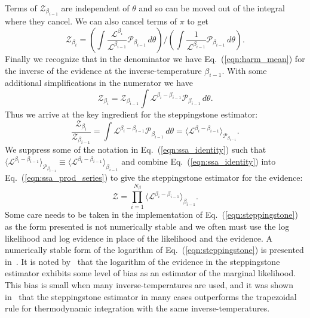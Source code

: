 Terms of $\mathcal{Z}_{\beta_{i-1}}$ are independent of $\theta$ and so can be moved out of the integral where they cancel. We can also cancel terms of $\pi$ to get
\begin{equation}
    \mathcal{Z}_{\beta_i} = \left(\int \frac{ \mathcal{L}^{\beta_i} }{\mathcal{L}^{\beta_{i-1}}} \mathcal{P}_{\beta_{i-1}} \, d\theta\right) \bigg / \left(\int \frac{1}{ \mathcal{L}^{\beta_{i-1}}} \mathcal{P}_{\beta_{i-1}} \, d\theta\right).
\end{equation}
Finally we recognize that in the denominator we have Eq.~(\ref{eqn:harm_mean}) for the inverse of the evidence at the inverse-temperature $\beta_{i-1}$. With some additional simplifications in the numerator we have
\begin{equation}
    \mathcal{Z}_{\beta_i} = \mathcal{Z}_{\beta_{i-1}} \int \mathcal{L}^{\beta_i - \beta_{i-1}}  \mathcal{P}_{\beta_{i-1}} \, d\theta.
\end{equation}
Thus we arrive at the key ingredient for the steppingstone estimator:
\begin{equation}\label{eqn:ssa_identity}
    \frac{\mathcal{Z}_{\beta_i}}{\mathcal{Z}_{\beta_{i-1}}} = \int \mathcal{L}^{\beta_i - \beta_{i-1}}  \mathcal{P}_{\beta_{i-1}} \, d\theta = \langle \mathcal{L}^{\beta_i - \beta_{i-1}} \rangle_{\mathcal{P}_{\beta_{i-1}}}.
\end{equation}
We suppress some of the notation in Eq.~(\ref{eqn:ssa_identity}) such that $\langle \mathcal{L}^{\beta_i - \beta_{i-1}} \rangle_{\mathcal{P}_{\beta_{i-1}}} \equiv \langle \mathcal{L}^{\beta_i - \beta_{i-1}} \rangle_{\beta_{i-1}}$ and combine Eq.~(\ref{eqn:ssa_identity}) into Eq.~(\ref{eqn:ssa_prod_series}) to  give the steppingstone estimator for the evidence:
\begin{equation}\label{eqn:steppingstone}
    \mathcal{Z} = \prod_{i=1}^{N_\beta} \langle \mathcal{L}^{\beta_i - \beta_{i-1}} \rangle_{\beta_{i-1}}. 
\end{equation}
Some care needs to be taken in the implementation of Eq.~(\ref{eqn:steppingstone}) as the form presented is not numerically stable and we often must use the log likelihood and log evidence in place of the likelihood and the evidence. A numerically stable form of the logarithm of Eq.~(\ref{eqn:steppingstone}) is presented in~\cite{xie2010improving}. It is noted by~\cite{xie2010improving} that the logarithm of the evidence in the steppingstone estimator exhibits some level of bias as an estimator of the marginal likelihood. This bias is small when many inverse-temperatures are used, and it was shown in~\cite{xie2010improving} that the steppingstone estimator in many cases outperforms the trapezoidal rule for thermodynamic integration with the same inverse-temperatures.

